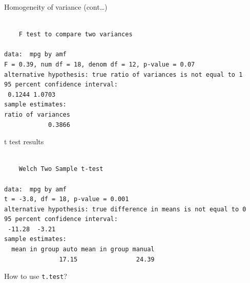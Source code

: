 \begin{frame}[fragile]{Homogeneity of variance (cont\ldots{})}

\begin{Shaded}
\begin{Highlighting}[]
\OperatorTok{~}
\end{Highlighting}
\end{Shaded}

\begin{verbatim}

    F test to compare two variances

data:  mpg by amf
F = 0.39, num df = 18, denom df = 12, p-value = 0.07
alternative hypothesis: true ratio of variances is not equal to 1
95 percent confidence interval:
 0.1244 1.0703
sample estimates:
ratio of variances 
            0.3866 
\end{verbatim}

\end{frame}

\begin{frame}[fragile]{t test results}

\begin{Shaded}
\begin{Highlighting}[]
\StringTok{ }\OperatorTok{~}\StringTok{ }
\end{Highlighting}
\end{Shaded}

\begin{verbatim}

    Welch Two Sample t-test

data:  mpg by amf
t = -3.8, df = 18, p-value = 0.001
alternative hypothesis: true difference in means is not equal to 0
95 percent confidence interval:
 -11.28  -3.21
sample estimates:
  mean in group auto mean in group manual 
               17.15                24.39 
\end{verbatim}

\end{frame}

\begin{frame}[fragile]{How to use \texttt{t.test}?}

\begin{Shaded}
\begin{Highlighting}[]
\end{Highlighting}
\end{Shaded}

\end{frame}

